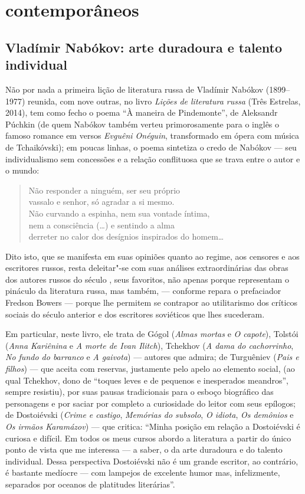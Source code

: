 \part{contemporâneos}

\chapter{Vladímir Nabókov: arte duradoura e talento individual}

Não por nada a primeira lição de literatura russa de Vladímir Nabókov
(1899--1977) reunida, com nove outras, no livro \emph{Lições de
literatura russa} (Três Estrelas, 2014), tem como fecho o poema
``À maneira de Pindemonte'', de Aleksandr Púchkin (de quem Nabókov
também verteu primorosamente para o inglês o famoso romance em versos
\emph{Evguêni Onéguin}, transformado em ópera com música de
Tchaikóvski); em poucas linhas, o poema sintetiza o credo de Nabókov ---
seu individualismo sem concessões e a relação conflituosa que se trava
entre o autor e o mundo:

\begin{verse}
Não responder a ninguém, ser seu próprio \\
vassalo e senhor, só agradar a si mesmo. \\
Não curvando a espinha, nem sua vontade \qb{}íntima, \\
nem a consciência (\ldots{}) e sentindo a alma \\
derreter no calor dos desígnios inspirados \qb{}do homem\ldots{}
\end{verse}

Dito isto, que se manifesta em suas opiniões quanto ao regime, aos
censores e aos escritores russos, resta deleitar"-se com suas análises
extraordinárias das obras dos autores russos do século , seus
favoritos, não apenas porque representam o pináculo da literatura russa,
mas também, --- conforme repara o prefaciador Fredson Bowers --- porque
lhe permitem se contrapor ao utilitarismo dos críticos sociais do século
anterior e dos escritores soviéticos que lhes sucederam.

Em particular, neste livro, ele trata de Gógol (\emph{Almas mortas} e
\emph{O capote}), Tolstói (\emph{Anna Kariênina} e \emph{A morte de Ivan
Ilitch}), Tchekhov (\emph{A dama do cachorrinho}, \emph{No fundo do
barranco} e \emph{A gaivota}) --- autores que admira; de Turguêniev
(\emph{Pais e filhos}) --- que aceita com reservas, justamente pelo apelo
ao elemento social, (ao qual Tchekhov, dono de ``toques leves e de
pequenos e inesperados meandros'', sempre resistiu), por suas pausas
tradicionais para o esboço biográfico das personagens e por saciar por
completo a curiosidade do leitor com seus epílogos; de Dostoiévski
(\emph{Crime e castigo}, \emph{Memórias do subsolo}, \emph{O idiota},
\emph{Os demônios} e \emph{Os irmãos Karamázov}) --- que critica: ``Minha
posição em relação a Dostoiévski é curiosa e difícil. Em todos os meus
cursos abordo a literatura a partir do único ponto de vista que me
interessa --- a saber, o da arte duradoura e do talento individual. Dessa
perspectiva Dostoiévski não é um grande escritor, ao contrário, é
bastante medíocre --- com lampejos de excelente humor mas, infelizmente,
separados por oceanos de platitudes literárias''.

